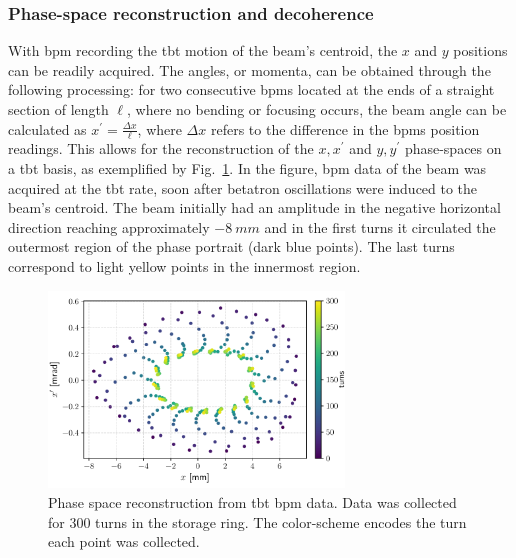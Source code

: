 \subsubsection{Phase-space reconstruction and decoherence}
With \gls*{bpm} recording the \gls*{tbt} motion of the beam's centroid, the $x$ and $y$ positions can be readily acquired. The angles, or momenta, can be obtained through the following processing: for two consecutive \glspl*{bpm} located at the ends of a straight section of length $\ell$, where no bending or focusing occurs, the beam angle can be calculated as $x^\prime = \frac{\Delta x}{\ell}$, where $\Delta x$ refers to the difference in the \glspl*{bpm} position readings. This allows for the reconstruction of the $x, x^\prime$ and $y, y^\prime$ phase-spaces on a \gls*{tbt} basis, as exemplified by Fig.~\ref{fig:phase_space_recons}. In the figure, \gls*{bpm} data of the beam was acquired at the \gls*{tbt} rate, soon after betatron oscillations were induced to the beam's centroid. The beam initially had an amplitude in the negative horizontal direction reaching approximately $-8~\unit{mm}$ and in the first turns it circulated the outermost region of the phase portrait (dark blue points). The last turns correspond to light yellow points in the innermost region.
\begin{figure}
    \centering
    \includegraphics[width=0.7\textwidth]{Images/phase_space_recons.pdf}
    \caption[Phase space reconstruction from TbT BPM data.]{Phase space reconstruction from \gls*{tbt} \gls*{bpm} data. Data was collected for 300 turns in the storage ring. The color-scheme encodes the turn each point was collected.}
    \label{fig:phase_space_recons}
\end{figure}

